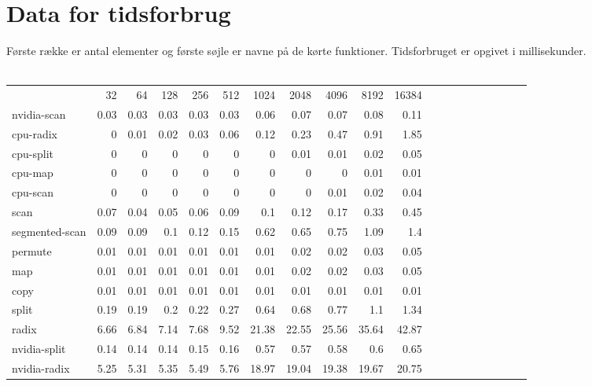 
\appendix

\section{Data for tidsforbrug}
\label{benchmark-data}

Første række er antal elementer og første søjle er navne på de kørte funktioner.
Tidsforbruget er opgivet i millisekunder.
\\\\
{\scriptsize
\begin{tabular}{lrrrrrrrrrrrrrrrrrrr}
&32&64&128&256&512&1024&2048&4096&8192&16384\\
nvidia-scan&0.03&0.03&0.03&0.03&0.03&0.06&0.07&0.07&0.08&0.11\\
cpu-radix&0&0.01&0.02&0.03&0.06&0.12&0.23&0.47&0.91&1.85\\
cpu-split&0&0&0&0&0&0&0.01&0.01&0.02&0.05\\
cpu-map&0&0&0&0&0&0&0&0&0.01&0.01\\
cpu-scan&0&0&0&0&0&0&0&0.01&0.02&0.04\\
scan&0.07&0.04&0.05&0.06&0.09&0.1&0.12&0.17&0.33&0.45\\
segmented-scan&0.09&0.09&0.1&0.12&0.15&0.62&0.65&0.75&1.09&1.4\\
permute&0.01&0.01&0.01&0.01&0.01&0.01&0.02&0.02&0.03&0.05\\
map&0.01&0.01&0.01&0.01&0.01&0.01&0.02&0.02&0.03&0.05\\
copy&0.01&0.01&0.01&0.01&0.01&0.01&0.01&0.01&0.01&0.01\\
split&0.19&0.19&0.2&0.22&0.27&0.64&0.68&0.77&1.1&1.34\\
radix&6.66&6.84&7.14&7.68&9.52&21.38&22.55&25.56&35.64&42.87\\
nvidia-split&0.14&0.14&0.14&0.15&0.16&0.57&0.57&0.58&0.6&0.65\\
nvidia-radix&5.25&5.31&5.35&5.49&5.76&18.97&19.04&19.38&19.67&20.75\\
\end{tabular}}
\\\\
